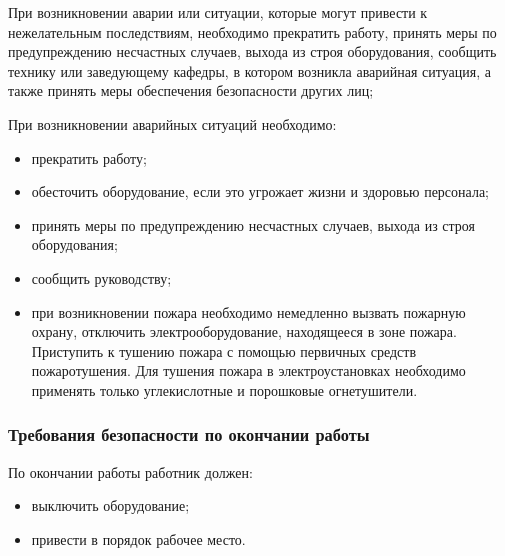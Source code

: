 При возникновении аварии или ситуации, которые могут привести к нежелательным последствиям, необходимо прекратить работу, принять меры по предупреждению несчастных случаев, выхода из строя оборудования, сообщить технику или заведующему кафедры, в котором возникла аварийная ситуация, а также принять меры обеспечения безопасности других лиц;

При возникновении аварийных ситуаций необходимо:

\begin{itemize}
\item прекратить работу;
\item обесточить оборудование, если это угрожает жизни и здоровью персонала;
\item принять меры по предупреждению несчастных случаев, выхода из строя оборудования;
\item сообщить руководству;
\end{itemize}

\begin{itemize}
\item при возникновении пожара необходимо немедленно вызвать пожарную охрану, отключить электрооборудование, находящееся в зоне пожара. Приступить к тушению пожара с помощью первичных средств пожаротушения. Для тушения пожара в электроустановках необходимо применять только углекислотные и порошковые огнетушители.
\end{itemize}
\subsubsection{Требования безопасности по окончании работы}

По окончании работы работник должен:

\begin{itemize}
\item выключить оборудование;
\item привести в порядок рабочее место.
\end{itemize}
